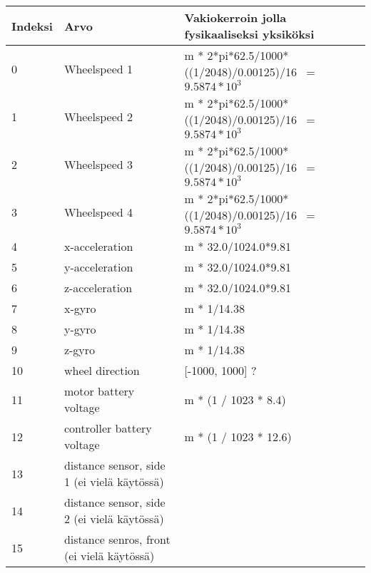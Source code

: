 \begin{longtable}{l | p{5cm} | l }
Indeksi & Arvo & Vakiokerroin jolla fysikaaliseksi yksiköksi \\ \hline
0 & Wheelspeed 1 & m * 2*pi*62.5/1000*((1/2048)/0.00125)/16 ~= $9.5874*10^3$ \\
1 & Wheelspeed 2 & m * 2*pi*62.5/1000*((1/2048)/0.00125)/16 ~= $9.5874*10^3$ \\
2 & Wheelspeed 3 & m * 2*pi*62.5/1000*((1/2048)/0.00125)/16 ~= $9.5874*10^3$ \\
3 & Wheelspeed 4 & m * 2*pi*62.5/1000*((1/2048)/0.00125)/16 ~= $9.5874*10^3$ \\
4 & x-acceleration & m * 32.0/1024.0*9.81 \\
5 & y-acceleration & m * 32.0/1024.0*9.81 \\
6 & z-acceleration & m * 32.0/1024.0*9.81 \\
7 & x-gyro & m * 1/14.38 \\
8 & y-gyro & m * 1/14.38 \\
9 & z-gyro & m * 1/14.38 \\
10 & wheel direction & [-1000, 1000] ? \\
11 & motor battery voltage & m * (1 / 1023 * 8.4) \\
12 & controller battery voltage & m * (1 / 1023 * 12.6) \\
13 & distance sensor, side 1 (ei vielä käytössä) & \\
14 & distance sensor, side 2 (ei vielä käytössä) & \\
15 & distance senros, front (ei vielä käytössä) & \\
\end{longtable}
